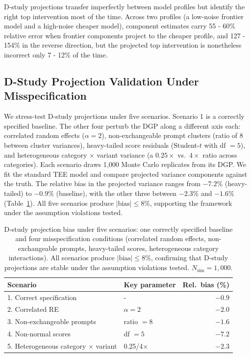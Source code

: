 D-study projections transfer imperfectly between model profiles but identify the right top intervention most of the time. Across two profiles (a low-noise frontier model and a high-noise cheaper model), component estimates carry 55 - 60\% relative error when frontier components project to the cheaper profile, and 127 - 154\% in the reverse direction, but the projected top intervention is nonetheless incorrect only 7 - 12\% of the time.

\subsection{D-Study Projection Validation Under Misspecification}
\label{si:dstudy_validation}

We stress-test D-study projections under five scenarios. Scenario 1 is a correctly specified baseline. The other four perturb the DGP along a different axis each: correlated random effects ($\alpha = 2$), non-exchangeable prompt clusters (ratio of 8 between cluster variances), heavy-tailed score residuals (Student-$t$ with df $= 5$), and heterogeneous category $\times$ variant variance (a $0.25\times$ vs.\ $4\times$ ratio across categories). Each scenario draws 1{,}000 Monte Carlo replicates from its DGP. We fit the standard TEE model and compare projected variance components against the truth. The relative bias in the projected variance ranges from $-7.2\%$ (heavy-tailed) to $-0.9\%$ (baseline), with the other three between $-2.3\%$ and $-1.6\%$ (Table~\ref{tab:dstudy_misspec}). All five scenarios produce $|\text{bias}| \leq 8\%$, supporting the framework under the assumption violations tested.

\begin{table}[h]
\centering
\small
\caption{D-study projection bias under five scenarios: one correctly specified baseline and four misspecification conditions (correlated random effects, non-exchangeable prompts, heavy-tailed scores, heterogeneous category interactions). All scenarios produce $|\text{bias}| \leq 8\%$, confirming that D-study projections are stable under the assumption violations tested. $N_\text{sim} = 1,000$.}
\label{tab:dstudy_misspec}
\begin{tabular}{llr}
\toprule
Scenario & Key parameter & Rel.\ bias (\%) \\
\midrule
1. Correct specification & - & $-0.9$ \\
2. Correlated RE & $\alpha = 2$ & $-2.0$ \\
3. Non-exchangeable prompts & ratio $= 8$ & $-1.6$ \\
4. Non-normal scores & df $= 5$ & $-7.2$ \\
5. Heterogeneous category $\times$ variant & 0.25/4$\times$ & $-2.3$ \\
\bottomrule
\end{tabular}
\end{table}

